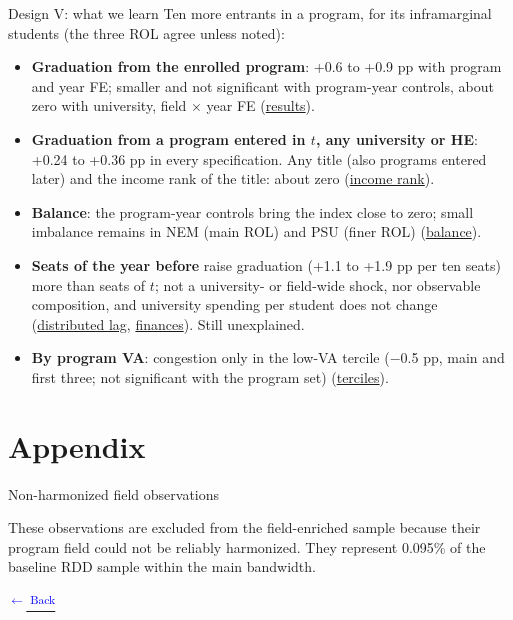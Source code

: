 \documentclass{beamer}
\begin{document}
\begin{frame}[label=d5-summary]{Design V: what we learn}
\footnotesize
Ten more entrants in a program, for its inframarginal students (the three ROL agree unless noted):
\begin{itemize}
    \setlength{\itemsep}{4pt}
    \item \textbf{Graduation from the enrolled program}: +0.6 to +0.9 pp with program and year FE; smaller and not significant with program-year controls, about zero with university, field $\times$ year FE (\hyperlink{d5-results}{\color{blue}results}).
    \item \textbf{Graduation from a program entered in $t$, any university or HE}: +0.24 to +0.36 pp in every specification. Any title (also programs entered later) and the income rank of the title: about zero (\hyperlink{d5-incrank}{\color{blue}income rank}).
    \item \textbf{Balance}: the program-year controls bring the index close to zero; small imbalance remains in NEM (main ROL) and PSU (finer ROL) (\hyperlink{d5-balance}{\color{blue}balance}).
    \item \textbf{Seats of the year before} raise graduation (+1.1 to +1.9 pp per ten seats) more than seats of $t$; not a university- or field-wide shock, nor observable composition, and university spending per student does not change (\hyperlink{d5-leadlag-joint}{\color{blue}distributed lag}, \hyperlink{d5-tm1-finance-levels}{\color{blue}finances}). Still unexplained.
    \item \textbf{By program VA}: congestion only in the low-VA tercile ($-$0.5 pp, main and first three; not significant with the program set) (\hyperlink{d5-va-terciles}{\color{blue}terciles}).
\end{itemize}
\end{frame}

\section{Appendix}

\begin{frame}[label=nonharmonizedfields]{Non-harmonized field observations}

\begin{table}
\centering
\scriptsize

\end{table}

\vskip 0.15cm

\footnotesize
These observations are excluded from the field-enriched sample because their program field could not be reliably harmonized. They represent 0.095\% of the baseline RDD sample within the main bandwidth.

\vskip 0.25cm

\hyperlink{descriptivestats}{\textcolor{blue}{\textsuperscript{$\leftarrow$ Back}}}

\end{frame}
\end{document}
